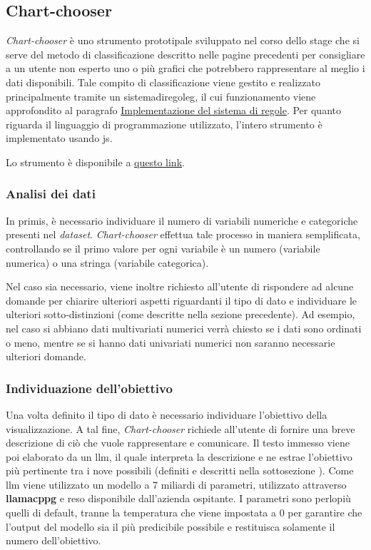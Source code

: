 \subsection{Chart-chooser}
\emph{Chart-chooser} è uno strumento prototipale sviluppato nel corso dello stage che si serve del metodo di classificazione descritto 
nelle pagine precedenti per consigliare a un utente non esperto uno o più grafici che potrebbero rappresentare al meglio i dati disponibili.
Tale compito di classificazione viene gestito e realizzato principalmente tramite un \gls{sistemadiregoleg}, il cui funzionamento viene approfondito al paragrafo
\hyperref[subsubsec:rules]{Implementazione del sistema di regole}. Per quanto riguarda il linguaggio di programmazione utilizzato, l'intero strumento è implementato usando
\gls{js}.

Lo strumento è disponibile a \href{https://github.com/jeskarr/progetto_stage/tree/main/chart-chooser}{questo link}.

\subsubsection{Analisi dei dati}
In primis, è necessario individuare il numero di variabili numeriche e categoriche presenti nel \emph{dataset}.
\emph{Chart-chooser} effettua tale processo in maniera semplificata, controllando se il primo valore per ogni variabile
è un numero (variabile numerica) o una stringa (variabile categorica).

Nel caso sia necessario, viene inoltre richiesto all'utente di rispondere ad alcune domande per chiarire ulteriori aspetti riguardanti il tipo 
di dato e individuare le ulteriori sotto-distinzioni (come descritte nella sezione precedente). Ad esempio, nel caso si abbiano dati multivariati numerici verrà chiesto 
se i dati sono ordinati o meno, mentre se si hanno dati univariati numerici non saranno necessarie ulteriori domande.

\subsubsection{Individuazione dell'obiettivo}
Una volta definito il tipo di dato è necessario individuare l'obiettivo della visualizzazione.
A tal fine, \emph{Chart-chooser} richiede all'utente di fornire una breve descrizione di ciò che vuole rappresentare e comunicare.
Il testo immesso viene poi elaborato da un \gls{llm}, il quale interpreta la descrizione e ne estrae l'obiettivo più pertinente tra i nove possibili (definiti e descritti nella sottosezione ). 
Come \gls{llm} viene utilizzato un modello a 7 miliardi di parametri, utilizzato attraverso \textbf{\gls{llamacppg}} e reso disponibile dall'azienda ospitante. I parametri sono perlopiù quelli di default, tranne la temperatura che viene 
impostata a 0 per garantire che l'output del modello sia il più predicibile possibile e restituisca solamente il numero dell'obiettivo.

